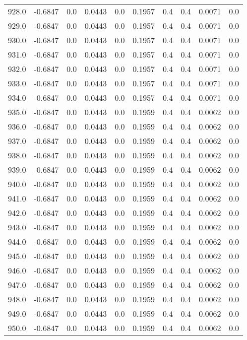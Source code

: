 \begin{longtable}{lrrrrrrrrr}
928.0 & -0.6847 & 0.0 & 0.0443 & 0.0 & 0.1957 & 0.4 & 0.4 & 0.0071 & 0.0 \\
929.0 & -0.6847 & 0.0 & 0.0443 & 0.0 & 0.1957 & 0.4 & 0.4 & 0.0071 & 0.0 \\
930.0 & -0.6847 & 0.0 & 0.0443 & 0.0 & 0.1957 & 0.4 & 0.4 & 0.0071 & 0.0 \\
931.0 & -0.6847 & 0.0 & 0.0443 & 0.0 & 0.1957 & 0.4 & 0.4 & 0.0071 & 0.0 \\
932.0 & -0.6847 & 0.0 & 0.0443 & 0.0 & 0.1957 & 0.4 & 0.4 & 0.0071 & 0.0 \\
933.0 & -0.6847 & 0.0 & 0.0443 & 0.0 & 0.1957 & 0.4 & 0.4 & 0.0071 & 0.0 \\
934.0 & -0.6847 & 0.0 & 0.0443 & 0.0 & 0.1957 & 0.4 & 0.4 & 0.0071 & 0.0 \\
935.0 & -0.6847 & 0.0 & 0.0443 & 0.0 & 0.1959 & 0.4 & 0.4 & 0.0062 & 0.0 \\
936.0 & -0.6847 & 0.0 & 0.0443 & 0.0 & 0.1959 & 0.4 & 0.4 & 0.0062 & 0.0 \\
937.0 & -0.6847 & 0.0 & 0.0443 & 0.0 & 0.1959 & 0.4 & 0.4 & 0.0062 & 0.0 \\
938.0 & -0.6847 & 0.0 & 0.0443 & 0.0 & 0.1959 & 0.4 & 0.4 & 0.0062 & 0.0 \\
939.0 & -0.6847 & 0.0 & 0.0443 & 0.0 & 0.1959 & 0.4 & 0.4 & 0.0062 & 0.0 \\
940.0 & -0.6847 & 0.0 & 0.0443 & 0.0 & 0.1959 & 0.4 & 0.4 & 0.0062 & 0.0 \\
941.0 & -0.6847 & 0.0 & 0.0443 & 0.0 & 0.1959 & 0.4 & 0.4 & 0.0062 & 0.0 \\
942.0 & -0.6847 & 0.0 & 0.0443 & 0.0 & 0.1959 & 0.4 & 0.4 & 0.0062 & 0.0 \\
943.0 & -0.6847 & 0.0 & 0.0443 & 0.0 & 0.1959 & 0.4 & 0.4 & 0.0062 & 0.0 \\
944.0 & -0.6847 & 0.0 & 0.0443 & 0.0 & 0.1959 & 0.4 & 0.4 & 0.0062 & 0.0 \\
945.0 & -0.6847 & 0.0 & 0.0443 & 0.0 & 0.1959 & 0.4 & 0.4 & 0.0062 & 0.0 \\
946.0 & -0.6847 & 0.0 & 0.0443 & 0.0 & 0.1959 & 0.4 & 0.4 & 0.0062 & 0.0 \\
947.0 & -0.6847 & 0.0 & 0.0443 & 0.0 & 0.1959 & 0.4 & 0.4 & 0.0062 & 0.0 \\
948.0 & -0.6847 & 0.0 & 0.0443 & 0.0 & 0.1959 & 0.4 & 0.4 & 0.0062 & 0.0 \\
949.0 & -0.6847 & 0.0 & 0.0443 & 0.0 & 0.1959 & 0.4 & 0.4 & 0.0062 & 0.0 \\
950.0 & -0.6847 & 0.0 & 0.0443 & 0.0 & 0.1959 & 0.4 & 0.4 & 0.0062 & 0.0 \\

\end{longtable}

